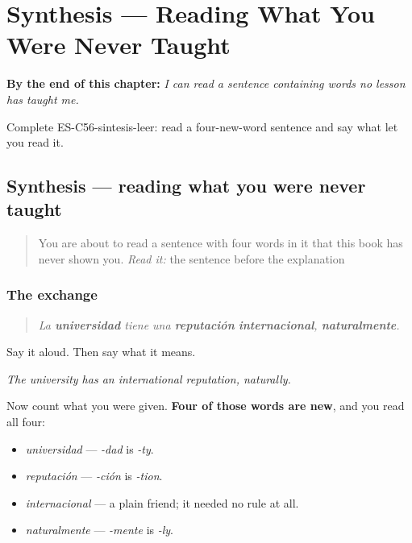 
\chapter{Synthesis --- Reading What You Were Never Taught}
\label{ch:synthesis-friends}

\begin{chapteropening}
\textbf{By the end of this chapter:} \emph{I can read a sentence containing words no lesson has taught me.}

Complete ES-C56-sintesis-leer: read a four-new-word sentence and say what let you read it.
\end{chapteropening}

\section[Practice]{Synthesis — reading what you were never taught}

\label{lesson:ES-C56-sintesis-leer}



\begin{quote}
You are about to read a sentence with four words in it that this book has never shown you. \emph{Read it:} the sentence before the explanation
\end{quote}

\subsection*{The exchange}
\begin{quote}
\emph{La \textbf{universidad} tiene una \textbf{reputación} \textbf{internacional}, \textbf{naturalmente}.}
\end{quote}

Say it aloud. Then say what it means.

\emph{The university has an international reputation, naturally.}

Now count what you were given. \textbf{Four of those words are new}, and you read all four:

\begin{itemize}
\raggedright
  \item \emph{universidad} — \emph{-dad} is \emph{-ty}.
  \item \emph{reputación} — \emph{-ción} is \emph{-tion}.
  \item \emph{internacional} — a plain friend; it needed no rule at all.
  \item \emph{naturalmente} — \emph{-mente} is \emph{-ly}.
\end{itemize}

